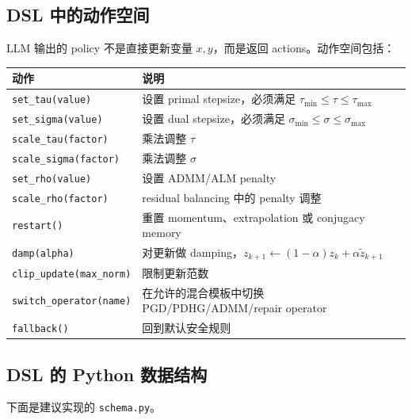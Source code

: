 \documentclass[12pt,a4paper]{ctexart}
\begin{document}
\subsection{DSL 中的动作空间}
LLM 输出的 policy 不是直接更新变量 $x,y$，而是返回 actions。动作空间包括：
\begin{longtable}{p{}p{}}
\toprule
动作 & 说明 \\
\midrule
\texttt{set\_tau(value)} & 设置 primal stepsize，必须满足 $\tau_{\min}\le \tau \le \tau_{\max}$ \\
\texttt{set\_sigma(value)} & 设置 dual stepsize，必须满足 $\sigma_{\min}\le \sigma \le \sigma_{\max}$ \\
\texttt{scale\_tau(factor)} & 乘法调整 $\tau$ \\
\texttt{scale\_sigma(factor)} & 乘法调整 $\sigma$ \\
\texttt{set\_rho(value)} & 设置 ADMM/ALM penalty \\
\texttt{scale\_rho(factor)} & residual balancing 中的 penalty 调整 \\
\texttt{restart()} & 重置 momentum、extrapolation 或 conjugacy memory \\
\texttt{damp(alpha)} & 对更新做 damping，$z_{k+1}\leftarrow (1-\alpha)z_k+\alpha \tilde z_{k+1}$ \\
\texttt{clip\_update(max\_norm)} & 限制更新范数 \\
\texttt{switch\_operator(name)} & 在允许的混合模板中切换 PGD/PDHG/ADMM/repair operator \\
\texttt{fallback()} & 回到默认安全规则 \\
\bottomrule
\end{longtable}

\subsection{DSL 的 Python 数据结构}
下面是建议实现的 \texttt{schema.py}。
\end{document}
